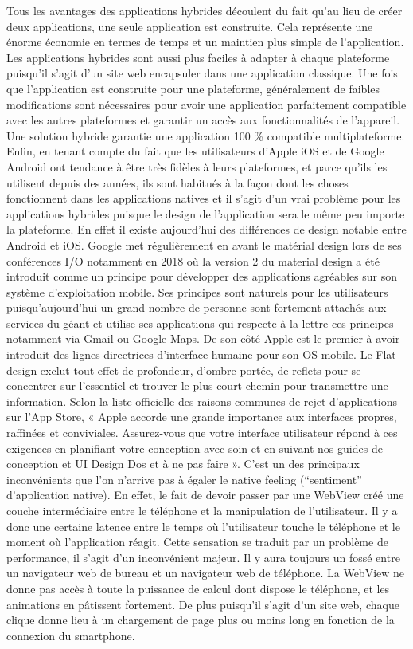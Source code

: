 Tous les avantages des applications hybrides découlent du fait qu’au lieu de créer deux applications, une seule application est construite. Cela représente une énorme économie en termes de temps et un maintien plus simple de l’application. Les applications hybrides sont aussi plus faciles à adapter à chaque plateforme puisqu'il s'agit d'un site web encapsuler dans une application classique. Une fois que l’application est construite pour une plateforme, généralement de faibles modifications sont nécessaires pour avoir une application parfaitement compatible avec les autres plateformes et garantir un accès aux fonctionnalités de l’appareil. Une solution hybride garantie une application 100 \% compatible multiplateforme. 
Enfin, en tenant compte du fait que les utilisateurs d’Apple iOS et de Google Android ont tendance à être très fidèles à leurs plateformes, et parce qu’ils les utilisent depuis des années, ils sont habitués à la façon dont les choses fonctionnent dans les applications natives et il s’agit d'un vrai problème pour les applications hybrides puisque le design de l’application sera le même peu importe la plateforme. En effet il existe aujourd’hui des différences de design notable entre Android et iOS. Google met régulièrement en avant le matérial design lors de ses conférences I/O notamment en 2018 où la version 2 du material design a été introduit comme un principe pour développer des applications agréables sur son système d’exploitation mobile. Ses principes sont naturels pour les utilisateurs puisqu’aujourd’hui un grand nombre de personne sont fortement attachés aux services du géant et utilise ses applications qui respecte à la lettre ces principes notamment via Gmail ou Google Maps. De son côté Apple est le premier à avoir introduit des lignes directrices d'interface humaine pour son OS mobile. Le Flat design exclut tout effet de profondeur, d'ombre portée, de reflets pour se concentrer sur l'essentiel et trouver le plus court chemin pour transmettre une information. Selon la liste officielle des raisons communes de rejet d’applications sur l’App Store, « Apple accorde une grande importance aux interfaces propres, raffinées et conviviales. Assurez-vous que votre interface utilisateur répond à ces exigences en planifiant votre conception avec soin et en suivant nos guides de conception et UI Design Dos et à ne pas faire »\cite{AppleRejection}. C'est un des principaux inconvénients que l’on n’arrive pas à égaler le native feeling (“sentiment” d’application native). En effet, le fait de devoir passer par une WebView créé une couche intermédiaire entre le téléphone et la manipulation de l’utilisateur. Il y a donc une certaine latence entre le temps où l’utilisateur touche le téléphone et le moment où l’application réagit. Cette sensation se traduit par un problème de performance, il s'agit d'un inconvénient majeur. Il y aura toujours un fossé entre un navigateur web de bureau et un navigateur web de téléphone. La WebView ne donne pas accès à toute la puissance de calcul dont dispose le téléphone, et les animations en pâtissent fortement. De plus puisqu'il s'agit d'un site web, chaque clique donne lieu à un chargement de page plus ou moins long en fonction de la connexion du smartphone.




